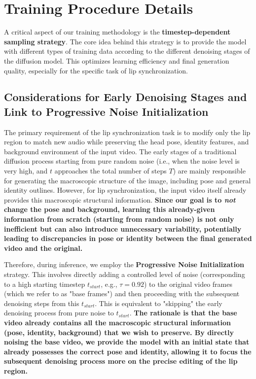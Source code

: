 

\section{Training Procedure Details}

A critical aspect of our training methodology is the \textbf{timestep-dependent sampling strategy}. The core idea behind this strategy is to provide the model with different types of training data according to the different denoising stages of the diffusion model. This optimizes learning efficiency and final generation quality, especially for the specific task of lip synchronization.

\subsection*{Considerations for Early Denoising Stages and Link to Progressive Noise Initialization}

The primary requirement of the lip synchronization task is to modify only the lip region to match new audio while preserving the head pose, identity features, and background environment of the input video. The early stages of a traditional diffusion process starting from pure random noise (i.e., when the noise level is very high, and $t$ approaches the total number of steps $T$) are mainly responsible for generating the macroscopic structure of the image, including pose and general identity outlines. However, for lip synchronization, the input video itself already provides this macroscopic structural information. \textbf{Since our goal is to \textit{not} change the pose and background, learning this already-given information from scratch (starting from random noise) is not only inefficient but can also introduce unnecessary variability, potentially leading to discrepancies in pose or identity between the final generated video and the original.}

Therefore, during inference, we employ the \textbf{Progressive Noise Initialization} strategy. This involves directly adding a controlled level of noise (corresponding to a high starting timestep $t_{start}$, e.g., $\tau=0.92$) to the original video frames (which we refer to as "base frames") and then proceeding with the subsequent denoising steps from this $t_{start}$. This is equivalent to "skipping" the early denoising process from pure noise to $t_{start}$. \textbf{The rationale is that the base video already contains all the macroscopic structural information (pose, identity, background) that we wish to preserve. By directly noising the base video, we provide the model with an initial state that already possesses the correct pose and identity, allowing it to focus the subsequent denoising process more on the precise editing of the lip region.}

